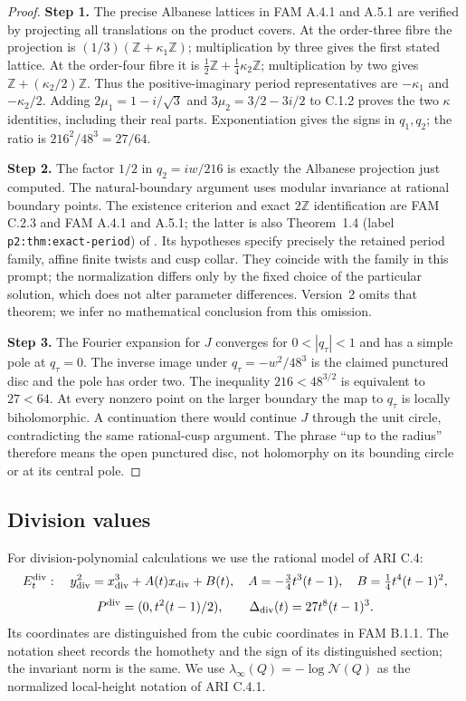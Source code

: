 \begin{proof}
\noindent\textbf{Step 1.} The precise Albanese lattices in FAM A.4.1 and A.5.1 are verified by projecting all
translations on the product covers. At the order-three fibre the
projection is $(1/3)(\mathbb Z+\kappa_1\mathbb Z)$; multiplication by
three gives the first stated lattice. At the order-four fibre it is
$\tfrac12\mathbb Z+\tfrac14\kappa_2\mathbb Z$; multiplication by two
gives $\mathbb Z+(\kappa_2/2)\mathbb Z$. Thus the positive-imaginary
period representatives are $-\kappa_1$ and $-\kappa_2/2$.
Adding $2\mu_1=1-i/\sqrt3$ and
$3\mu_2=3/2-3i/2$ to C.1.2 proves the two $\kappa$ identities,
including their real parts. Exponentiation gives the signs in $q_1,q_2$;
the ratio is $216^2/48^3=27/64$.


\noindent\textbf{Step 2.} The factor $1/2$ in $q_2=iw/216$ is exactly the Albanese projection just computed. The natural-boundary argument uses modular invariance at rational boundary points. The existence criterion and exact $2\mathbb Z$
identification are FAM C.2.3 and FAM A.4.1 and A.5.1; the latter is also Theorem~1.4
(label \texttt{p2:thm:exact-period}) of
\cite[Theorem~1.4 (\texttt{p2:thm:exact-period})]{DGKXv1}. Its hypotheses specify precisely the
retained period family, affine finite twists and cusp collar. They
coincide with the family in this prompt; the normalization differs
only by the fixed choice of the particular solution, which does not
alter parameter differences. Version~2 \cite[Introduction]{DGKXv2} omits that theorem; we infer
no mathematical conclusion from this omission.


\noindent\textbf{Step 3.} The Fourier expansion for $J$ converges for $0<|q_\tau|<1$ and has a simple
pole at $q_\tau=0$. The inverse image under $q_\tau=-w^2/48^3$ is the claimed
punctured disc and the pole has order two. The inequality
$216<48^{3/2}$ is equivalent to $27<64$. At every nonzero point on the
larger boundary the map to $q_\tau$ is locally biholomorphic. A continuation
there would continue $J$ through the unit circle, contradicting the
same rational-cusp argument. The phrase ``up to the
radius'' therefore means the open punctured disc, not holomorphy on
its bounding circle or at its central pole.
\end{proof}

\subsection{Division values}
For division-polynomial calculations we use the rational model of ARI C.4:
\[
E^{\rm div}_t:\quad y_{\rm div}^2=x_{\rm div}^3+A(t)x_{\rm div}+B(t),\quad
A=-\tfrac34t^3(t-1),\quad B=\tfrac14t^4(t-1)^2,
\]
\[
P^{\rm div}=(0,t^2(t-1)/2),\qquad \Delta_{\rm div}(t)=27t^8(t-1)^3.
\]
Its coordinates are distinguished from the cubic coordinates in FAM B.1.1. The notation sheet records the homothety and the sign of its distinguished section; the invariant norm is the same. We use $\lambda_\infty(Q)=-\log\mathcal N(Q)$ as the normalized local-height notation of ARI C.4.1.

